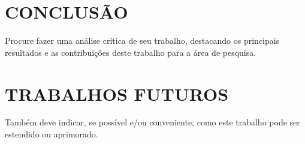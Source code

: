 
\chapter{CONCLUSÃO}
\label{chap:conclusao}

Procure fazer uma análise crítica de seu trabalho, destacando os principais resultados e as contribuições deste trabalho para a área de pesquisa.

\chapter{TRABALHOS FUTUROS}
\label{chap:trabalhosFuturos}

Também deve indicar, se possível e/ou conveniente, como este trabalho pode ser estendido ou aprimorado.




